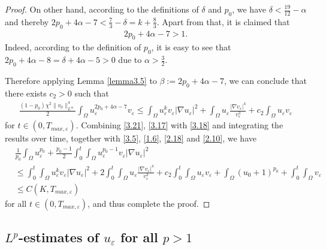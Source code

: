 \documentclass[12pt]{article}
\theoremstyle{plain}
\theoremstyle{definition}
\numberwithin{equation}{section}
\begin{document}
\begin{proof}
 On other hand, according to the definitions of $\delta$ and $p_0$, we have  $\delta<\frac{19}{12}-\alpha$ and thereby  $2p_0+4\alpha-7< \frac 73-\delta =k+\frac 83$.
 Apart from that, it is claimed that
  \begin{align}\label{3.19}
  2p_0+4\alpha-7>1.
  \end{align}
  Indeed, according to the definition of  $p_0$,  it is easy to see that
  $ 2p_0+4\alpha-8=\delta+4\alpha -5>0$  due to $\alpha>\frac 32$.


 Therefore applying Lemma \ref{lemma3.5} to $\beta:=2p_0+4\alpha-7$,   we can conclude that
   there exists $c_2 >0$ such that
\begin{align}\label{3.21}
   \frac{(1-p_0)\chi^2\|v_0\|_{L^{\infty}}^4}{2}\int_{\Omega}u_{\varepsilon}^{2p_0+4\alpha-7}v_{\varepsilon}\leq
    \int_{\Omega}u_{\varepsilon}^{k}v_{\varepsilon}|\nabla u_{\varepsilon}|^2+\int_{\Omega}u_{\varepsilon}\frac{|\nabla
    v_{\varepsilon}|^4}{v_{\varepsilon}^3}+c_2\int_{\Omega}u_{\varepsilon}v_{\varepsilon}
\end{align}
for  $t\in (0,T_{max,\varepsilon})$. Combining \eqref{3.21}, \eqref{3.17}  with  \eqref{3.18} and  integrating the results over time, together with  \eqref{3.5}, \eqref{1.6}, \eqref{2.18} and \eqref{2.10},  we have
\begin{align}\label{3.22}
     & \frac{1}{p_0}\int_{\Omega}u_{\varepsilon}^{p_0} +\frac{p_0-1}{2}\int_0^{t}\int_{\Omega}u_{\varepsilon}^{p_0-1}v_{\varepsilon}|\nabla
     u_{\varepsilon}|^2 \nonumber
    \\
    &\leq \int_0^{t}\int_{\Omega}u_{\varepsilon}^{k}v_{\varepsilon}|\nabla
    u_{\varepsilon}|^2+2\int_0^{t}\int_{\Omega}u_{\varepsilon}\frac{|\nabla
    v_{\varepsilon}|^4}{v_{\varepsilon}^3}+c_2\int_0^{t}\int_{\Omega}u_{\varepsilon}v_{\varepsilon}+
    \int_{\Omega}(u_{0}+1)^{p_0}+\int_0^{t}\int_{\Omega}v_{\varepsilon}\nonumber
    \\
    &\leq C(K,T_{max,\varepsilon})
\end{align}
for all $t\in (0,T_{max,\varepsilon})$, and thus complete the proof.
 \end{proof}

\subsection{ $L^{p}$-estimates of $u_{\varepsilon}$ for all $p> 1$}
\end{document}
